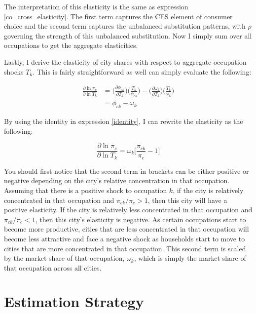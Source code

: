 \documentclass[10pt]{article}
\begin{document}
The interpretation of this elasticity is the same as expression \ref{co_cross_elasticity}. The first term captures the CES element of consumer choice and the second term captures the unbalanced substitution patterns, with $\rho$ governing the strength of this unbalanced substitution. Now I simply sum over all occupations to get the aggregate elasticities.

Lastly, I derive the elasticity of city shares with respect to aggregate occupation shocks $T_k$. This is fairly straightforward as well can simply evaluate the following:

\begin{align*}
    \frac{\partial\ln{\pi_{c}}}{\partial\ln{T_{k}}} & = \Big(\frac{\partial{\phi_{ck}}}{\partial{T_{k}}}\Big)\Big(\frac{T_{k}}{\phi_{ck}}\Big) - \Big(\frac{\partial{\omega_{k}}}{\partial{T_{k}}}\Big)\Big(\frac{T_{k}}{\omega_{k}}\Big) \\ &= \phi_{ck}-\omega_{k}
\end{align*}

By using the identity in expression \ref{identity}, I can rewrite the elasticity as the following:

\begin{equation}
    \frac{\partial\ln{\pi_{c}}}{\partial\ln{T_{k}}} = {\omega_{k}}\Bigg[\frac{\pi_{ck}}{\pi_{c}}-1\Bigg]
    \label{city_occupation_elasticity}
\end{equation}

You should first notice that the second term in brackets can be either positive or negative depending on the city's relative concentration in that occupation. Assuming that there is a positive shock to occupation $k$, if the city is relatively concentrated in that occupation and $\pi_{ck} / \pi_c > 1$, then this city will have a positive elasticity. If the city is relatively less concentrated in that occupation and $\pi_{ck} / \pi_c < 1$, then this city's elasticity is negative. As certain occupations start to become more productive, cities that are less concentrated in that occupation will become less attractive and face a negative shock as households start to move to cities that are more concentrated in that occupation. This second term is scaled by the market share of that occupation, $\omega_k$, which is simply the market share of that occupation across all cities.

\section{Estimation Strategy}
\end{document}
